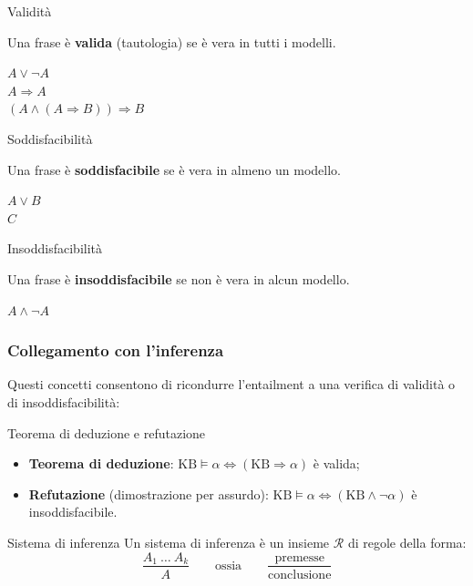 \documentclass[11pt, a4paper]{article}
\newcommand{\KB}{\mathrm{KB}}
\begin{document}
\begin{tcbraster}[raster columns=3, raster equal height, raster column skip=10pt, raster before skip=8pt, raster after skip=10pt]
  \begin{defbox}{Validità}
    \raggedright
    Una frase è \textbf{valida} (tautologia) se è vera in tutti i modelli.
    \begin{esempio}
      $A \lor \lnot A$ \\
      $A \Rightarrow A$ \\
      $(A \land (A \Rightarrow B)) \Rightarrow B$
    \end{esempio}
  \end{defbox}
  \begin{defbox}{Soddisfacibilità}
    \raggedright
    Una frase è \textbf{soddisfacibile} se è vera in almeno un modello.
    \begin{esempio}
      $A \lor B$ \\
      $C$
    \end{esempio}
  \end{defbox}
  \begin{defbox}{Insoddisfacibilità}
    \raggedright
    Una frase è \textbf{insoddisfacibile} se non è vera in alcun modello.
    \begin{esempio}
      $A \land \lnot A$
    \end{esempio}
  \end{defbox}
\end{tcbraster}

\subsubsection*{Collegamento con l'inferenza}

Questi concetti consentono di ricondurre l'entailment a una verifica di validità o di insoddisfacibilità:

\begin{chiave}{Teorema di deduzione e refutazione}
  \begin{itemize}
    \item \textbf{Teorema di deduzione}: $\KB \models \alpha \iff (\KB \Rightarrow \alpha)$ è valida;
    \item \textbf{Refutazione} (dimostrazione per assurdo): $\KB \models \alpha \iff (\KB \land \lnot\alpha)$ è insoddisfacibile.
  \end{itemize}
\end{chiave}

\begin{defbox}{Sistema di inferenza}
  Un sistema di inferenza è un insieme $\mathcal{R}$ di regole della forma:
  \[
    \frac{A_1 \ \dots \ A_k}{A}
    \qquad \text{ossia} \qquad
    \frac{\text{premesse}}{\text{conclusione}}
  \]
\end{defbox}
\end{document}
